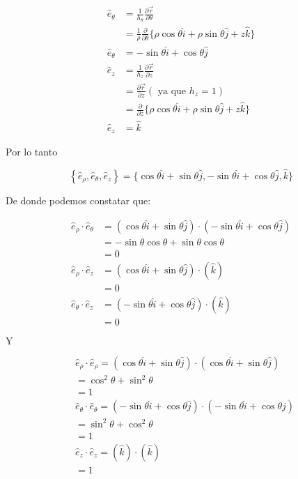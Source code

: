 $$
\begin{aligned}
\hat{e}_{\theta} & =\frac{1}{h_{\theta}} \frac{\partial \vec{r}}{\partial \theta} \\
& =\frac{1}{\rho} \frac{\partial}{\partial \theta}\{\rho \cos \theta \hat{i}+\rho \sin \theta \hat{j}+z \hat{k}\} \\
\hat{e}_{\theta} & =-\sin \theta \hat{i}+\cos \theta \hat{j} \\
\widehat{e}_{z} & =\frac{1}{h_{z}} \frac{\partial \vec{r}}{\partial z} \\
& =\frac{\partial \vec{r}}{\partial z}\left(\text { ya que } h_{z}=1\right) \\
& =\frac{\partial}{\partial z}\{\rho \cos \theta \hat{i}+\rho \sin \theta \hat{j}+z \hat{k}\} \\
\hat{e}_{z} & =\hat{k}
\end{aligned}
$$

Por lo tanto

$$
\left\{\widehat{e}_{\rho}, \hat{e}_{\theta}, \hat{e}_{z}\right\}=\{\cos \theta \hat{i}+\sin \theta \hat{j},-\sin \theta \hat{i}+\cos \theta \hat{j}, \hat{k}\}
$$

De donde podemos constatar que:

$$
\begin{aligned}
\widehat{e}_{\rho} \cdot \hat{e}_{\theta} & =(\cos \theta \hat{i}+\sin \theta \hat{j}) \cdot(-\sin \theta \hat{i}+\cos \theta \hat{j}) \\
& =-\sin \theta \cos \theta+\sin \theta \cos \theta \\
& =0 \\
\hat{e}_{\rho} \cdot \widehat{e}_{z} & =(\cos \theta \hat{i}+\sin \theta \hat{j}) \cdot(\hat{k}) \\
& =0 \\
\widehat{e}_{\theta} \cdot \hat{e}_{z} & =(-\sin \theta \hat{i}+\cos \theta \hat{j}) \cdot(\hat{k}) \\
& =0
\end{aligned}
$$

$\mathrm{Y}$

$$
\begin{aligned}
& \hat{e}_{\rho} \cdot \hat{e}_{\rho}=(\cos \theta \hat{i}+\sin \theta \hat{j}) \cdot(\cos \theta \hat{i}+\sin \theta \hat{j}) \\
& =\cos ^{2} \theta+\sin ^{2} \theta \\
& =1 \\
& \widehat{e}_{\theta} \cdot \hat{e}_{\theta}=(-\sin \theta \hat{i}+\cos \theta \hat{j}) \cdot(-\sin \theta \hat{i}+\cos \theta \hat{j}) \\
& =\sin ^{2} \theta+\cos ^{2} \theta \\
& =1 \\
& \hat{e}_{z} \cdot \hat{e}_{z}=(\hat{k}) \cdot(\widehat{k}) \\
& =1
\end{aligned}
$$

